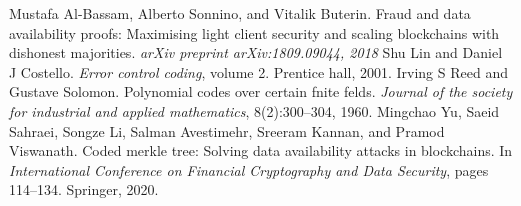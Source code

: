 \renewcommand{\bibname}{References}
\begin{thebibliography}{9}
	 Mustafa Al-Bassam, Alberto Sonnino, and Vitalik Buterin. Fraud and data availability proofs: Maximising light client security and scaling blockchains with dishonest majorities. \textit{arXiv preprint arXiv:1809.09044, 2018}
	 Shu Lin and Daniel J Costello. \textit{Error control coding}, volume 2. Prentice hall, 2001.
	 Irving S Reed and Gustave Solomon. Polynomial codes over certain fnite felds. \textit{Journal of the society for industrial and applied mathematics}, 8(2):300–304, 1960.
	 Mingchao Yu, Saeid Sahraei, Songze Li, Salman Avestimehr, Sreeram Kannan, and Pramod Viswanath. Coded merkle tree: Solving data availability attacks in blockchains. In \textit{International Conference on Financial Cryptography and Data Security}, pages 114–134. Springer, 2020.
\end{thebibliography}